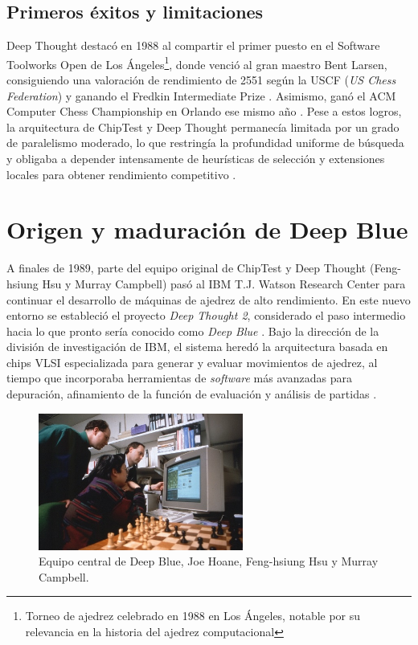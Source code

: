 \documentclass[a4paper, 12pt]{article}
\begin{document}
\subsection{Primeros éxitos y limitaciones}

Deep Thought destacó en 1988 al compartir el primer puesto en el 
Software Toolworks Open de Los Ángeles\footnote{Torneo de ajedrez celebrado en 1988 en Los Ángeles, notable por su relevancia en la historia del ajedrez computacional}, 
donde venció al gran 
maestro Bent Larsen, consiguiendo una valoración de rendimiento 
de 2551 según la USCF (\emph{US Chess Federation}) y ganando 
el Fredkin Intermediate Prize \cite{hsu1990grandmaster}. 
Asimismo, ganó el ACM Computer Chess 
Championship en Orlando ese mismo año \cite{hsu1990grandmaster}. Pese a 
estos logros, la arquitectura de ChipTest y Deep Thought 
permanecía limitada por un grado de paralelismo moderado, 
lo que restringía la profundidad uniforme de 
búsqueda y obligaba a depender intensamente de heurísticas de 
selección y extensiones locales para obtener rendimiento 
competitivo \cite{hsu1990deep}.








\section{Origen y maduración de Deep Blue}

A finales de 1989, parte del equipo original de ChipTest y Deep 
Thought (Feng-hsiung Hsu y Murray Campbell) pasó al IBM T.J. 
Watson Research Center para continuar el desarrollo de máquinas 
de ajedrez de alto rendimiento. En este nuevo entorno se 
estableció el proyecto \textit{Deep Thought 2}, considerado el 
paso intermedio hacia lo que pronto sería conocido como 
\textit{Deep Blue} \cite{campbell2002deep}. Bajo la dirección de la 
división de investigación de IBM, el sistema heredó la 
arquitectura basada en chips VLSI especializada para generar y 
evaluar movimientos de ajedrez, al tiempo que incorporaba 
herramientas de \emph{software} más avanzadas para depuración, 
afinamiento de la función de evaluación y análisis de partidas 
\cite{campbell2002deep}.

\begin{figure}[h]
    \centering
    \includegraphics[width=0.6\textwidth]{assets/Deep Blue's core team, Joe Hoane, Feng-hsiung Hsu, and Murray Campbell.jpg}
    \caption{Equipo central de Deep Blue, Joe Hoane, Feng-hsiung Hsu y Murray Campbell.}
    \label{fig:team}
\end{figure}
\end{document}
